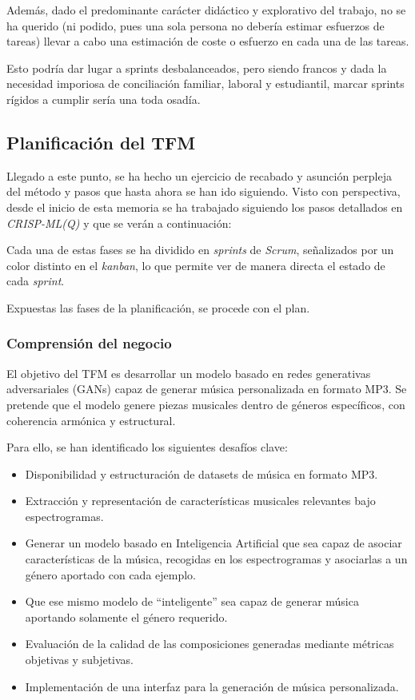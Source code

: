 Además, dado el predominante carácter didáctico y explorativo del trabajo, no se ha querido (ni podido, pues una sola persona no debería estimar esfuerzos de tareas) llevar a cabo una estimación de coste o esfuerzo en cada una de las tareas.

Esto podría dar lugar a sprints desbalanceados, pero siendo francos y dada la necesidad imporiosa de conciliación familiar, laboral y estudiantil, marcar sprints rígidos a cumplir sería una toda osadía.

\subsection{Planificación del TFM}

Llegado a este punto, se ha hecho un ejercicio de recabado y asunción perpleja del método y pasos que hasta ahora se han ido siguiendo. Visto con perspectiva, desde el inicio de esta memoria se ha trabajado siguiendo los pasos detallados en \emph{CRISP-ML(Q)} y que se verán a continuación:


Cada una de estas fases se ha dividido en \emph{sprints} de \emph{Scrum}, señalizados por un color distinto en el \emph{kanban}, lo que permite ver de manera directa el estado de cada \emph{sprint}.

Expuestas las fases de la planificación, se procede con el plan.

\subsubsection{Comprensión del negocio}

El objetivo del TFM es desarrollar un modelo basado en redes generativas adversariales (GANs) capaz de generar música personalizada en formato MP3. Se pretende que el modelo genere piezas musicales dentro de géneros específicos, con coherencia armónica y estructural.

Para ello, se han identificado los siguientes desafíos clave:
\begin{itemize}
    \item Disponibilidad y estructuración de datasets de música en formato MP3.
    \item Extracción y representación de características musicales relevantes bajo espectrogramas.
    \item Generar un modelo basado en Inteligencia Artificial que sea capaz de asociar características de la música, recogidas en los espectrogramas y asociarlas a un género aportado con cada ejemplo.
    \item Que ese mismo modelo de ``inteligente'' sea capaz de generar música aportando solamente el género requerido.
    \item Evaluación de la calidad de las composiciones generadas mediante métricas objetivas y subjetivas.
    \item Implementación de una interfaz para la generación de música personalizada.
\end{itemize}

